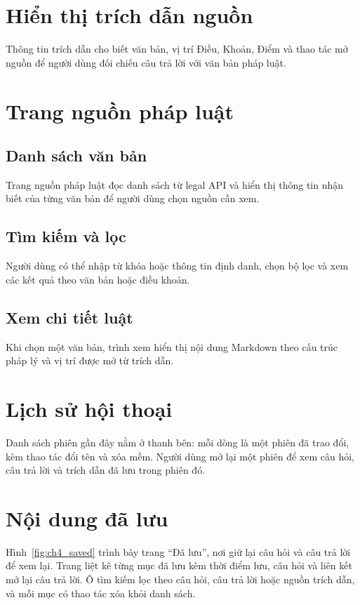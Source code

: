 \documentclass[12pt,a4paper,oneside]{report}
\begin{document}
\section{Hiển thị trích dẫn nguồn}
Thông tin trích dẫn cho biết văn bản, vị trí Điều, Khoản, Điểm và thao tác mở nguồn để người dùng đối chiếu câu trả lời với văn bản pháp luật.

\section{Trang nguồn pháp luật}
\subsection{Danh sách văn bản}
Trang nguồn pháp luật đọc danh sách từ legal API và hiển thị thông tin nhận biết của từng văn bản để người dùng chọn nguồn cần xem.
\subsection{Tìm kiếm và lọc}
Người dùng có thể nhập từ khóa hoặc thông tin định danh, chọn bộ lọc và xem các kết quả theo văn bản hoặc điều khoản.
\subsection{Xem chi tiết luật}
Khi chọn một văn bản, trình xem hiển thị nội dung Markdown theo cấu trúc pháp lý và vị trí được mở từ trích dẫn.

\section{Lịch sử hội thoại}
Danh sách phiên gần đây nằm ở thanh bên: mỗi dòng là một phiên đã trao đổi, kèm thao tác đổi tên và xóa mềm. Người dùng mở lại một phiên để xem câu hỏi, câu trả lời và trích dẫn đã lưu trong phiên đó.

\section{Nội dung đã lưu}
Hình~\ref{fig:ch4_saved} trình bày trang ``Đã lưu'', nơi giữ lại câu hỏi và câu trả lời để xem lại.
Trang liệt kê từng mục đã lưu kèm thời điểm lưu, câu hỏi và liên kết mở lại câu trả lời. Ô tìm kiếm lọc theo câu hỏi, câu trả lời hoặc nguồn trích dẫn, và mỗi mục có thao tác xóa khỏi danh sách.
\end{document}

